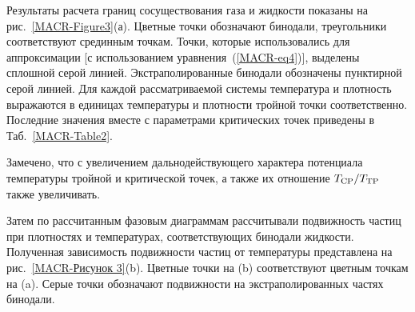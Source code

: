 Результаты расчета границ сосуществования газа и жидкости показаны на рис.~\ref{MACR-Figure3}(а).
Цветные точки обозначают бинодали, треугольники соответствуют срединным точкам.
Точки, которые использовались для аппроксимации [с использованием уравнения~(\ref{MACR-eq4})], выделены сплошной серой линией.
Экстраполированные бинодали обозначены пунктирной серой линией.
Для каждой рассматриваемой системы температура и плотность выражаются в единицах температуры и плотности тройной точки соответственно.
Последние значения вместе с параметрами критических точек приведены в Таб.~\ref{MACR-Table2}.

%

Замечено, что с увеличением дальнодействующего характера потенциала температуры тройной и критической точек, а также их отношение $T_{\rm CP}/T_{\rm TP}$ также увеличивать.

Затем по рассчитанным фазовым диаграммам рассчитывали подвижность частиц при плотностях и температурах, соответствующих бинодали жидкости. Полученная зависимость подвижности частиц от температуры представлена на рис.~\ref{MACR-Рисунок 3}(b). Цветные точки на (b) соответствуют цветным точкам на (a). Серые точки обозначают подвижности на экстраполированных частях бинодали.

